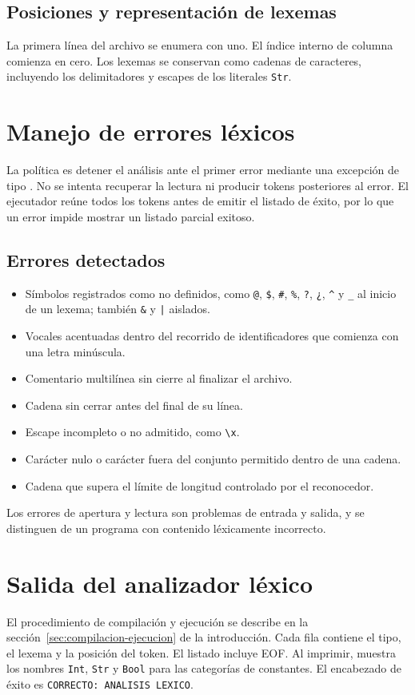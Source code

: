 \subsection{Posiciones y representación de lexemas}
La primera línea del archivo se enumera con uno. El índice interno de columna
comienza en cero. Los lexemas se conservan como cadenas de caracteres, incluyendo los delimitadores y escapes de los
literales \texttt{Str}.

\section{Manejo de errores léxicos}
La política es detener el análisis ante el primer error mediante una excepción
de tipo . No se intenta recuperar la lectura ni producir
tokens posteriores al error. El ejecutador reúne todos los tokens antes de emitir el
listado de éxito, por lo que un error impide mostrar un listado parcial exitoso.

\subsection{Errores detectados}
\begin{itemize}[leftmargin=*]
  \item Símbolos registrados como no definidos, como \verb~@~, \verb~$~,
        \verb~#~, \verb~%~, \verb~?~, \verb~¿~, \verb~^~ y \verb~_~ al inicio
        de un lexema; también \verb~&~ y \verb~|~ aislados.
  \item Vocales acentuadas dentro del recorrido de identificadores que comienza
        con una letra minúscula.
  \item Comentario multilínea sin cierre al finalizar el archivo.
  \item Cadena sin cerrar antes del final de su línea.
  \item Escape incompleto o no admitido, como \verb~\x~.
  \item Carácter nulo o carácter fuera del conjunto permitido dentro de una cadena.
  \item Cadena que supera el límite de longitud controlado por el reconocedor.
\end{itemize}
Los errores de apertura y lectura son problemas de entrada y salida, y se
distinguen de un programa con contenido léxicamente incorrecto.

\section{Salida del analizador léxico}
El procedimiento de compilación y ejecución se describe en la
sección~\ref{sec:compilacion-ejecucion} de la introducción.
Cada fila contiene el tipo, el lexema y la posición del token. El listado
incluye EOF. Al imprimir,  muestra los nombres
\texttt{Int}, \texttt{Str} y \texttt{Bool} para las categorías de constantes.
El encabezado de éxito es \texttt{CORRECTO: ANALISIS LEXICO}.

